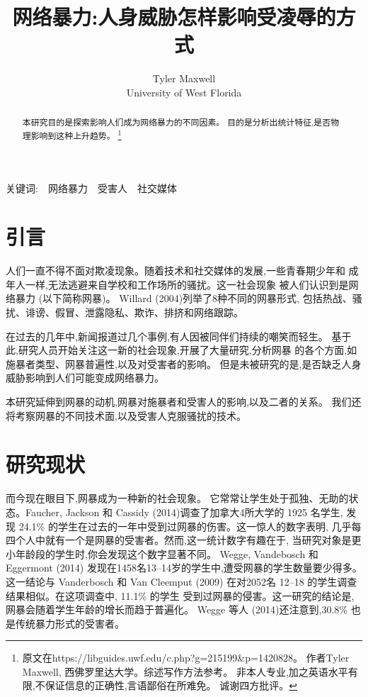 \documentclass[a4paper]{article}
\title{网络暴力:人身威胁怎样影响受凌辱的方式}
\author{Tyler Maxwell\\[2ex] University of West Florida}
\begin{document}
\maketitle

\begin{abstract}
本研究目的是探索影响人们成为网络暴力的不同因素。
目的是分析出统计特征,是否物理影响到这种上升趋势。
\footnote{原文在https://libguides.uwf.edu/c.php?g=215199\&p=1420828。
作者Tyler Maxwell, 西佛罗里达大学。综述写作方法参考\cite{rand2009}。
非本人专业,加之英语水平有限,不保证信息的正确性,言语鄙俗在所难免。
诚谢四方批评。}
\end{abstract}

关键词:~~网络暴力~~受害人~~社交媒体


\section{引言}
人们一直不得不面对欺凌现象。随着技术和社交媒体的发展,一些青春期少年和
成年人一样,无法逃避来自学校和工作场所的骚扰。这一社会现象
被人们认识到是网络暴力 (以下简称网暴)。
Willard (2004)\citep{Willard2004}列举了8种不同的网暴形式,
包括热战、骚扰、诽谤、假冒、泄露隐私、欺诈、排挤和网络跟踪。

在过去的几年中,新闻报道过几个事例,有人因被同伴们持续的嘲笑而轻生。
基于此,研究人员开始关注这一新的社会现象,开展了大量研究,分析网暴
的各个方面,如施暴者类型、网暴普遍性,以及对受害者的影响。
但是未被研究的是,是否缺乏人身威胁影响到人们可能变成网络暴力。

本研究延伸到网暴的动机,网暴对施暴者和受害人的影响,以及二者的关系。
我们还将考察网暴的不同技术面,以及受害人克服骚扰的技术。

\section{研究现状}
而今现在眼目下,网暴成为一种新的社会现象。
它常常让学生处于孤独、无助的状态。Faucher, Jackson 和
Cassidy (2014)\cite{faucher2014}调查了加拿大4所大学的 1925 名学生,
发现 24.1\% 的学生在过去的一年中受到过网暴的伤害。这一惊人的数字表明,
几乎每四个人中就有一个是网暴的受害者。然而,这一统计数字有趣在于,
当研究对象是更小年龄段的学生时,你会发现这个数字显著不同。
Wegge, Vandebosch 和 Eggermont (2014)\cite{wegge2014}
发现在1458名13--14岁的学生中,遭受网暴的学生数量要少得多。
这一结论与 Vanderbosch 和 Van Cleemput (2009)\cite{vander2009}
在对2052名 12--18 的学生调查结果相似。在这项调查中, 11.1\% 的学生
受到过网暴的侵害。这一研究的结论是,网暴会随着学生年龄的增长而趋于普遍化。
Wegge 等人 (2014)\cite{wegge2014}还注意到,30.8\% 也是传统暴力形式的受害者。
\end{document}
